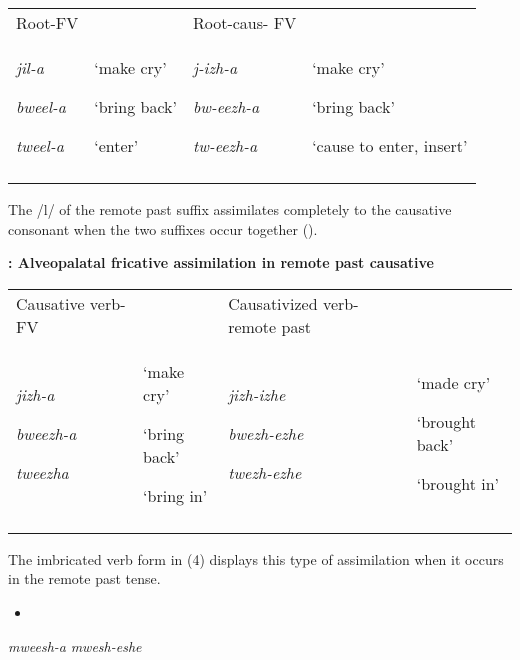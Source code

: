 \documentclass[output=paper]{langsci/langscibook}
\begin{document}
\begin{tabular}{llll}
\lsptoprule
\mdseries Root-FV &  & \mdseries Root-caus- FV & \\
{\mdseries \emph{jil-a }}

{\mdseries \emph{bweel-a}}

\mdseries \emph{tweel-a} & {\mdseries ‘make cry’}

{\mdseries ‘bring back’}

\mdseries ‘enter’ & {\mdseries \emph{j-izh-a }}

{\mdseries \emph{bw-eezh-a }}

\mdseries \emph{tw-eezh-a} & {\mdseries ‘make cry’}

{\mdseries ‘bring back’}

\mdseries ‘cause to enter, insert’\\
\lspbottomrule
\end{tabular}
The /l/ of the remote past suffix assimilates completely to the causative consonant when the two suffixes occur together ().

\textbf{:  Alveopalatal fricative assimilation in remote past causative}

\begin{tabular}{llll}
\lsptoprule
\mdseries Causative verb-FV &  & \mdseries Causativized verb-remote past & \\
{\mdseries \emph{jizh-a }}

{\mdseries \emph{bweezh-a }}

\mdseries \emph{tweezha} & {\mdseries ‘make cry’}

{\mdseries ‘bring back’}

\mdseries ‘bring in’ & {\mdseries \emph{jizh-izhe }}

{\mdseries \emph{bwezh-ezhe }}

\mdseries \emph{twezh-ezhe} & {\mdseries ‘made cry’}

{\mdseries ‘brought back’}

\mdseries ‘brought in’\\
\lspbottomrule
\end{tabular}
The imbricated verb form in (4) displays this type of assimilation when it occurs in the remote past tense. 

\begin{itemize}
\item \end{itemize}
\begin{stylelsSourceline}
\emph{mweesh-a}    \emph{mwesh-eshe}  
\end{stylelsSourceline}
\end{document}
